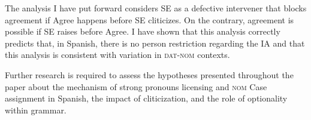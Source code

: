 \documentclass[output=paper,colorlinks,citecolor=brown]{langscibook}
\begin{document}
The analysis I have put forward considers SE as a defective intervener that blocks agreement if Agree happens before SE cliticizes. On the contrary, agreement is possible if SE raises before Agree. I have shown that this analysis correctly predicts that, in Spanish, there is no person restriction regarding the IA and that this analysis is consistent with variation in \textsc{dat}-\textsc{nom} contexts.

Further research is required to assess the hypotheses presented throughout the paper about the mechanism of strong pronouns licensing and \textsc{nom} Case assignment in Spanish, the impact of cliticization, and the role of optionality within grammar.






\end{document}
